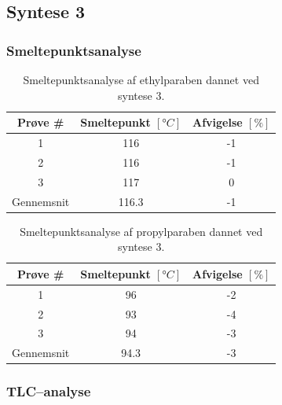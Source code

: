     \subsection{Syntese 3}
    \subsubsection{Smeltepunktsanalyse}

    \begin{table}[H]\centering
        \begin{tabular}{ccc}
                \toprule
                Prøve # & Smeltepunkt $\left[\si{\degree C}\right]$ & Afvigelse $\left[\%\right]$ \\
                \midrule
                1 & 116 & -1 \\
                2 & 116 & -1 \\
                3 & 117 & 0 \\
                \midrule
                Gennemsnit & 116.3 & -1 \\
                \bottomrule
            \end{tabular}
        \caption{Smeltepunktsanalyse af ethylparaben dannet ved syntese 3.}
    \end{table}
    
    \begin{table}[H]\centering
        \begin{tabular}{ccc}
            \toprule
            Prøve # & Smeltepunkt $\left[\si{\degree C}\right]$ & Afvigelse $\left[\%\right]$ \\
            \midrule
            1 & 96 & -2 \\
            2 & 93 & -4 \\
            3 & 94 & -3 \\
            \midrule
            Gennemsnit & 94.3 & -3 \\
            \bottomrule
        \end{tabular}
        \caption{Smeltepunktsanalyse af propylparaben dannet ved syntese 3.}
    \end{table}

    \subsubsection{TLC--analyse}
    
